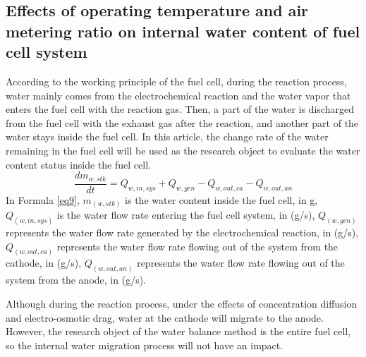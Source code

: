 

\subsection{Effects of operating temperature and air metering ratio on internal water content of fuel cell system}
According to the working principle of the fuel cell, during the reaction process, water mainly comes from the electrochemical reaction and the water vapor that enters the fuel cell with the reaction gas. Then, a part of the water is discharged from the fuel cell with the exhaust gas after the reaction, and another part of the water stays inside the fuel cell. In this article, the change rate of the water remaining in the fuel cell will be used as the research object to evaluate the water content status inside the fuel cell.
\begin{equation}
	\label{eq9}
	{\frac{d m_{w,s t k}}{d t}}=Q_{w,i n,s y s}+Q_{w,g e n}-Q_{w,o u t,c a}-Q_{w,o u t,a n}
\end{equation}
In Formula \ref{eq9}, $m_(w,stk)$ is the water content inside the fuel cell, in g, $Q_(w,in,sys)$ is the water flow rate entering the fuel cell system, in (g/s), $Q_(w,gen)$ represents the water flow rate generated by the electrochemical reaction, in (g/s), $Q_(w,out,ca)$ represents the water flow rate flowing out of the system from the cathode, in (g/s), $Q_(w,out,an)$ represents the water flow rate flowing out of the system from the anode, in (g/s).
\par
Although during the reaction process, under the effects of concentration diffusion and electro-osmotic drag, water at the cathode will migrate to the anode. However, the research object of the water balance method is the entire fuel cell, so the internal water migration process will not have an impact.
